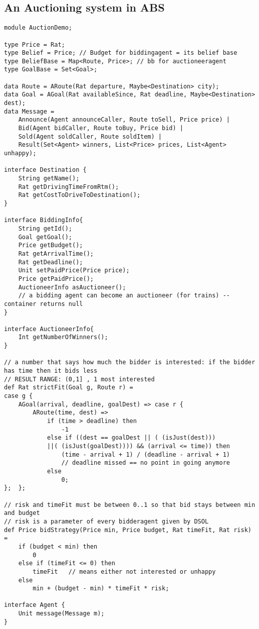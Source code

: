 \documentclass[runningheads,a4paper]{llncs}
\begin{document}
\subsection{ An Auctioning system in ABS}
\label{a1}
\begin{lstlisting}
module AuctionDemo;

type Price = Rat;
type Belief = Price; // Budget for biddingagent = its belief base
type BeliefBase = Map<Route, Price>; // bb for auctioneeragent
type GoalBase = Set<Goal>;

data Route = ARoute(Rat departure, Maybe<Destination> city);
data Goal = AGoal(Rat availableSince, Rat deadline, Maybe<Destination> dest);
data Message = 
	Announce(Agent announceCaller, Route toSell, Price price) | 
	Bid(Agent bidCaller, Route toBuy, Price bid) |
	Sold(Agent soldCaller, Route soldItem) |
	Result(Set<Agent> winners, List<Price> prices, List<Agent> unhappy);

interface Destination {
	String getName();
	Rat getDrivingTimeFromRtm();
	Rat getCostToDriveToDestination();
}

interface BiddingInfo{
	String getId();
	Goal getGoal();
	Price getBudget();
	Rat getArrivalTime();
	Rat getDeadline();
	Unit setPaidPrice(Price price);
	Price getPaidPrice();
	AuctioneerInfo asAuctioneer();   
	// a bidding agent can become an auctioneer (for trains) -- container returns null
}

interface AuctioneerInfo{
	Int getNumberOfWinners();
}

// a number that says how much the bidder is interested: if the bidder has time then it bids less
// RESULT RANGE: (0,1] , 1 most interested    
def Rat strictFit(Goal g, Route r) = 
case g {
	AGoal(arrival, deadline, goalDest) => case r {
		ARoute(time, dest) =>
			if (time > deadline) then
				-1
			else if ((dest == goalDest || ( (isJust(dest))) 
			||( (isJust(goalDest)))) && (arrival <= time)) then
				(time - arrival + 1) / (deadline - arrival + 1)   
				// deadline missed == no point in going anymore
			else
				0;
};	};

// risk and timeFit must be between 0..1 so that bid stays between min and budget
// risk is a parameter of every bidderagent given by DSOL
def Price bidStrategy(Price min, Price budget, Rat timeFit, Rat risk) =
	if (budget < min) then
		0
	else if (timeFit <= 0) then
		timeFit   // means either not interested or unhappy
	else
		min + (budget - min) * timeFit * risk;

interface Agent {
	Unit message(Message m);
}


\end{lstlisting}
\end{document}
